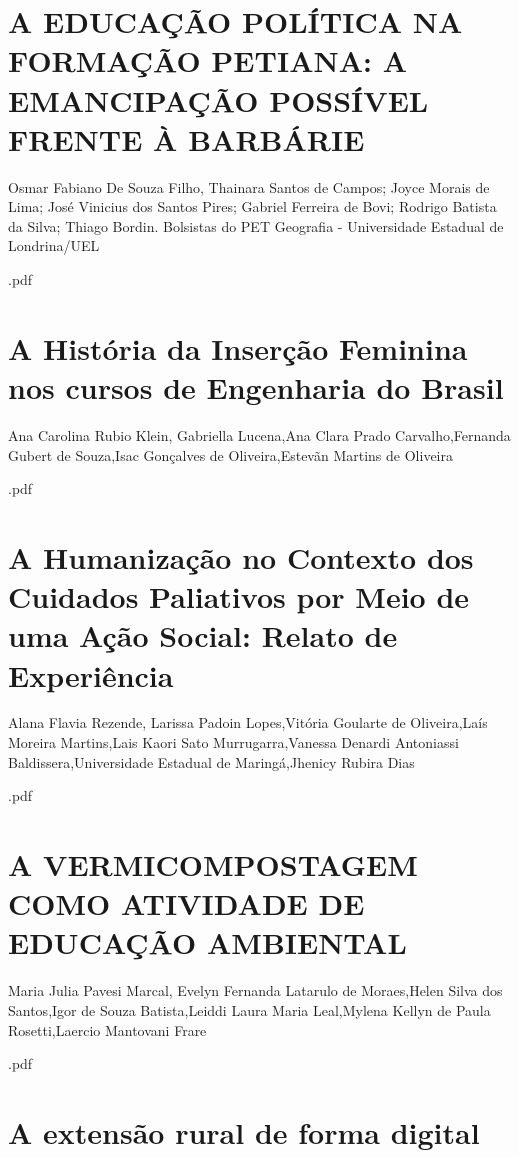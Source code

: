 \section{A EDUCAÇÃO POLÍTICA NA FORMAÇÃO PETIANA: A EMANCIPAÇÃO POSSÍVEL FRENTE À BARBÁRIE}

Osmar Fabiano De Souza Filho, Thainara Santos de Campos; Joyce Morais de Lima; José Vinicius dos Santos Pires;  Gabriel Ferreira de Bovi; Rodrigo Batista da Silva; Thiago Bordin.  Bolsistas do PET Geografia - Universidade Estadual de Londrina/UEL



.pdf\section{A História da Inserção Feminina nos cursos de Engenharia do Brasil}

Ana Carolina Rubio Klein, Gabriella Lucena,Ana Clara Prado Carvalho,Fernanda Gubert de Souza,Isac Gonçalves de Oliveira,Estevãn Martins de Oliveira



.pdf\section{A Humanização no Contexto dos Cuidados Paliativos por Meio de uma Ação Social: Relato de Experiência}

Alana Flavia Rezende, Larissa Padoin Lopes,Vitória Goularte de Oliveira,Laís Moreira Martins,Lais Kaori Sato Murrugarra,Vanessa Denardi Antoniassi Baldissera,Universidade Estadual de Maringá,Jhenicy Rubira Dias



.pdf\section{A VERMICOMPOSTAGEM COMO ATIVIDADE DE EDUCAÇÃO AMBIENTAL}

Maria Julia Pavesi Marcal, Evelyn Fernanda Latarulo de Moraes,Helen Silva dos Santos,Igor de Souza Batista,Leiddi Laura Maria Leal,Mylena Kellyn de Paula Rosetti,Laercio Mantovani Frare



.pdf\section{A extensão rural de forma digital }


